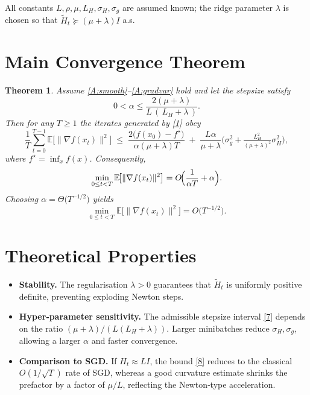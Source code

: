 \documentclass{article}
\newtheorem{theorem}{Theorem}
\newcommand{\EE}{\mathbb{E}}
\begin{document}
All constants $L,\rho,\mu,L_H,\sigma_H,\sigma_g$ are assumed known; the ridge
parameter $\lambda$ is chosen so that $\tilde H_t\succeq (\mu+\lambda)I$ a.s.

\section*{Main Convergence Theorem}
\begin{theorem}\label{thm:main}
Assume \ref{A:smooth}--\ref{A:gradvar} hold and let the stepsize satisfy
\[
0<\alpha\le\frac{2(\mu+\lambda)}{L\,(\,L_H+\lambda\,)} .
\tag{7}
\]
Then for any $T\ge1$ the iterates generated by \eqref{1} obey
\[
\frac{1}{T}\sum_{t=0}^{T-1}\EE\!\bigl[\|\nabla f(x_t)\|^{2}\bigr]
\;\le\;
\frac{2\bigl(f(x_0)-f^{\star}\bigr)}{\alpha(\mu+\lambda)T}
\;+\;
\frac{L\alpha}{\mu+\lambda}\bigl(\sigma_{g}^{2}+ \tfrac{L_H^{2}}{(\mu+\lambda)^{2}}\sigma_{H}^{2}\bigr),
\tag{8}
\]
where $f^{\star}=\inf_{x}f(x)$.  Consequently,
\[
\min_{0\le t<T}\EE\!\bigl[\|\nabla f(x_t)\|^{2}\bigr]
= O\!\Bigl(\frac{1}{\alpha T}+ \alpha\Bigr).
\]
Choosing $\alpha=\Theta\bigl(T^{-1/2}\bigr)$ yields
\[
\min_{0\le t<T}\EE\!\bigl[\|\nabla f(x_t)\|^{2}\bigr]=O\!\bigl(T^{-1/2}\bigr).
\]
\end{theorem}

\section*{Theoretical Properties}
\begin{itemize}
\item \textbf{Stability.}  The regularisation $\lambda>0$ guarantees that $\tilde H_t$ is uniformly
positive definite, preventing exploding Newton steps.
\item \textbf{Hyper‑parameter sensitivity.}  The admissible stepsize interval \eqref{7}
depends on the ratio $(\mu+\lambda)/(L(L_H+\lambda))$.  Larger minibatches
reduce $\sigma_H,\sigma_g$, allowing a larger $\alpha$ and faster convergence.
\item \textbf{Comparison to SGD.}  If $H_t\approx L I$, the bound \eqref{8} reduces to the classical
$O(1/\sqrt{T})$ rate of SGD, whereas a good curvature estimate shrinks the
prefactor by a factor of $\mu/L$, reflecting the Newton‑type acceleration.
\end{itemize}
\end{document}
